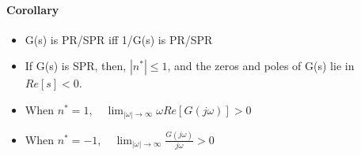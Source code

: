 \paragraph{Corollary}
\begin{itemize}
\item G(s) is PR/SPR iff 1/G(s) is PR/SPR
\item If G(s) is SPR, then, $|n^*| \leq 1$, and the zeros and poles of G(s) lie in $Re[s]<0$.
\item When $n^* = 1, \quad \lim_{|\omega| \to \infty} \omega Re[G(j\omega)] > 0 $
\item When $n^* = -1,\quad \lim_{|\omega| \to \infty} \frac{G(j\omega)}{j\omega} >0 $
\end{itemize}

